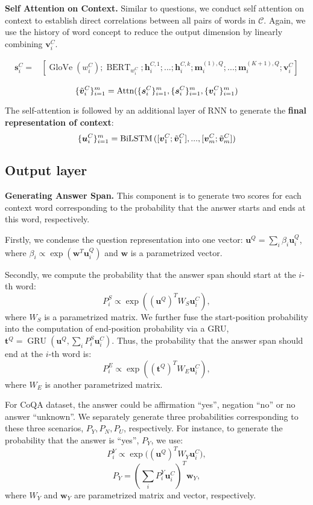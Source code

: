\documentclass{article} \usepackage{sdnet,times}
\newcommand{\B}[1] {\boldsymbol{#1}}
\def\bh{{\B{h}}}
\def\bm{{\B{m}}}
\def\bs{{\B{s}}}
\def\bt{{\B{t}}}
\def\bu{{\B{u}}}
\def\bv{{\B{v}}}
\def\bw{{\B{w}}}
\DeclareMathOperator{\gru}{GRU}
\DeclareMathOperator{\BiLSTM}{\mbox{BiLSTM}}
\DeclareMathOperator{\bert}{\mbox{BERT}}
\DeclareMathOperator{\glove}{GloVe}
\begin{document}
\textbf{Self Attention on Context.} Similar to questions, we conduct self attention on context to establish direct correlations between all pairs of words in $\mathcal{C}$. Again, we use the history of word concept to reduce the output dimension by linearly combining $\bv_i^C$. 

\begin{align*}
\bs_i^C  = &[\glove(w_i^C); \bert_{w_i^C}; \bh_i^{C,1}; ...; \bh_i^{C,k}; \bm_i^{(1),Q}; ...; \bm_i^{(K+1),Q}; \bv_i^C]
\end{align*}

$$\{\Tilde{\bv}_i^C\}_{i=1}^m=\mbox{Attn}(\{\bs_i^C\}_{i=1}^m, \{\bs_i^C\}_{i=1}^m, \{\bv_i^C\}_{i=1}^m)$$

The self-attention is followed by an additional layer of RNN to generate the \textbf{final representation of context}:
$$\{\bu_i^C\}_{i=1}^m = \BiLSTM{([\bv_1^C; \Tilde{\bv}_1^C], ..., [\bv_m^C; \Tilde{\bv}_m^C])}$$







\subsection{Output layer}
\textbf{Generating Answer Span.} This component is to generate two scores for each context word corresponding to the probability that the answer starts and ends at this word, respectively.

Firstly, we condense the question representation into one vector: $\bu^Q=\sum_i{\beta_i}\bu_i^Q$, where $\beta_i\propto{\exp{(\bw^T\bu_i^Q)}}$ and $\bw$ is a parametrized vector.

Secondly, we compute the probability that the answer span should start at the $i$-th word:
$$P_i^S\propto{\exp{((\bu^Q)^TW_S\bu_i^C)}},$$
where $W_S$ is a parametrized matrix. We further fuse the start-position probability into the computation of end-position probability via a GRU, $\bt^Q = \gru{(\bu^Q, \sum_i P_i^S\bu_i^C)}$. Thus, the probability that the answer span should end at the $i$-th word is:
$$P_i^E\propto{\exp{((\bt^Q)^TW_E\bu_i^C)}},$$
where $W_E$ is another parametrized matrix.

For CoQA dataset, the answer could be affirmation ``yes'', negation ``no'' or no answer ``unknown''. We separately generate three probabilities corresponding to these three scenarios, $P_Y, P_N, P_U$, respectively. For instance, to generate the probability that the answer is ``yes'', $P_Y$, we use:
$$P_i^{Y}\propto{\exp{((\bu^Q)^T W_{Y}\bu_i^C})},$$
$$P_{Y} = (\sum_i P_i^{Y}\bu_i^C)^T\bw_{Y},$$
where $W_Y$ and $\bw_Y$ are parametrized matrix and vector, respectively.
\end{document}
